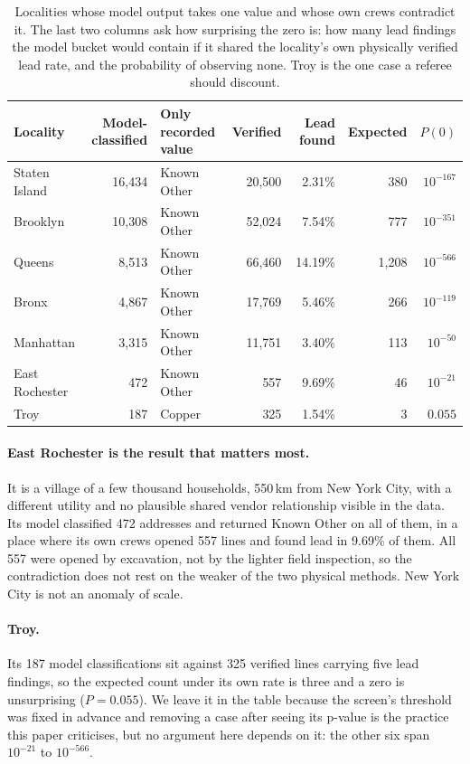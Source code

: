 \documentclass[11pt]{article}
\newcommand{\KO}{\textsf{Known Other}}
\begin{document}
\begin{table}[t]\centering\small
\caption{Localities whose model output takes one value and whose own crews contradict it.
The last two columns ask how surprising the zero is: how many lead findings the model bucket
would contain if it shared the locality's own physically verified lead rate, and the
probability of observing none. Troy is the one case a referee should discount.}
\label{tab:contra}
\begin{tabular}{lrlrrrr}
\toprule
Locality & Model-classified & Only recorded value & Verified & Lead found
  & Expected & $P(0)$ \\
\midrule
Staten Island   & 16,434 & \KO{} & 20,500 & 2.31\%  & 380   & $10^{-167}$ \\
Brooklyn        & 10,308 & \KO{} & 52,024 & 7.54\%  & 777   & $10^{-351}$ \\
Queens          &  8,513 & \KO{} & 66,460 & 14.19\% & 1,208 & $10^{-566}$ \\
Bronx           &  4,867 & \KO{} & 17,769 & 5.46\%  & 266   & $10^{-119}$ \\
Manhattan       &  3,315 & \KO{} & 11,751 & 3.40\%  & 113   & $10^{-50}$ \\
East Rochester  &    472 & \KO{} &    557 & 9.69\%  & 46    & $10^{-21}$ \\
Troy            &    187 & \textsf{Copper} & 325 & 1.54\% & 3 & $0.055$ \\
\bottomrule
\end{tabular}
\end{table}

\paragraph{East Rochester is the result that matters most.}
It is a village of a few thousand households, 550\,km from New York City, with a different
utility and no plausible shared vendor relationship visible in the data. Its model classified
472 addresses and returned \KO{} on all of them, in a place where its own crews opened 557
lines and found lead in 9.69\% of them. All 557 were opened by excavation, not by the lighter
field inspection, so the contradiction does not rest on the weaker of the two physical
methods. New York City is not an anomaly of scale.

\paragraph{Troy.}
Its 187 model classifications sit against 325 verified lines carrying five lead findings, so
the expected count under its own rate is three and a zero is unsurprising ($P = 0.055$). We
leave it in the table because the screen's threshold was fixed in advance and removing a case
after seeing its p-value is the practice this paper criticises, but no argument here depends
on it: the other six span $10^{-21}$ to $10^{-566}$.
\end{document}
